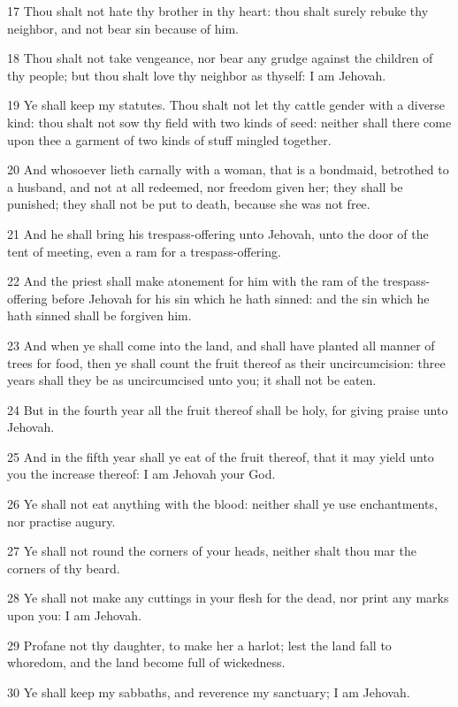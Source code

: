 \par 17 Thou shalt not hate thy brother in thy heart: thou shalt surely rebuke thy neighbor, and not bear sin because of him.
\par 18 Thou shalt not take vengeance, nor bear any grudge against the children of thy people; but thou shalt love thy neighbor as thyself: I am Jehovah.
\par 19 Ye shall keep my statutes. Thou shalt not let thy cattle gender with a diverse kind: thou shalt not sow thy field with two kinds of seed: neither shall there come upon thee a garment of two kinds of stuff mingled together.
\par 20 And whosoever lieth carnally with a woman, that is a bondmaid, betrothed to a husband, and not at all redeemed, nor freedom given her; they shall be punished; they shall not be put to death, because she was not free.
\par 21 And he shall bring his trespass-offering unto Jehovah, unto the door of the tent of meeting, even a ram for a trespass-offering.
\par 22 And the priest shall make atonement for him with the ram of the trespass-offering before Jehovah for his sin which he hath sinned: and the sin which he hath sinned shall be forgiven him.
\par 23 And when ye shall come into the land, and shall have planted all manner of trees for food, then ye shall count the fruit thereof as their uncircumcision: three years shall they be as uncircumcised unto you; it shall not be eaten.
\par 24 But in the fourth year all the fruit thereof shall be holy, for giving praise unto Jehovah.
\par 25 And in the fifth year shall ye eat of the fruit thereof, that it may yield unto you the increase thereof: I am Jehovah your God.
\par 26 Ye shall not eat anything with the blood: neither shall ye use enchantments, nor practise augury.
\par 27 Ye shall not round the corners of your heads, neither shalt thou mar the corners of thy beard.
\par 28 Ye shall not make any cuttings in your flesh for the dead, nor print any marks upon you: I am Jehovah.
\par 29 Profane not thy daughter, to make her a harlot; lest the land fall to whoredom, and the land become full of wickedness.
\par 30 Ye shall keep my sabbaths, and reverence my sanctuary; I am Jehovah.
